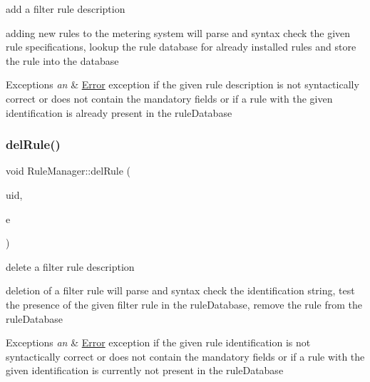 add a filter rule description 

adding new rules to the metering system will parse and syntax check the given rule specifications, lookup the rule database for already installed rules and store the rule into the database


\begin{DoxyExceptions}{Exceptions}
{\em an} & \hyperlink{classError}{Error} exception if the given rule description is not syntactically correct or does not contain the mandatory fields or if a rule with the given identification is already present in the rule\+Database \\
\hline
\end{DoxyExceptions}
\mbox{\label{classRuleManager_ab01b6ffe72edce8b9d8b8d3ff5baf55b}} 
\subsubsection{\texorpdfstring{del\+Rule()}{delRule()}}
{\footnotesize\ttfamily void Rule\+Manager\+::del\+Rule (\begin{DoxyParamCaption}\item[{int}]{uid,  }\item[{\hyperlink{classEventScheduler}{Event\+Scheduler} $\ast$}]{e }\end{DoxyParamCaption})}



delete a filter rule description 

deletion of a filter rule will parse and syntax check the identification string, test the presence of the given filter rule in the rule\+Database, remove the rule from the rule\+Database


\begin{DoxyExceptions}{Exceptions}
{\em an} & \hyperlink{classError}{Error} exception if the given rule identification is not syntactically correct or does not contain the mandatory fields or if a rule with the given identification is currently not present in the rule\+Database \\
\hline
\end{DoxyExceptions}
\mbox{\label{classRuleManager_a15995aaed6daab992a46aeeac5d54e06}} 
